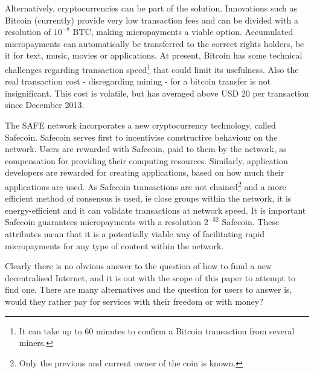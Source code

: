 \documentclass[twocolumn,english]{article}
\begin{document}
Alternatively, cryptocurrencies can be part of the solution. Innovations such as Bitcoin (currently) provide very low transaction fees and can be divided with a resolution of $10^{-8}$ BTC, making micropayments a viable option. Accumulated micropayments can automatically be transferred to the correct rights holders, be it for text, music, movies or applications. At present, Bitcoin has some technical challenges regarding transaction speed\footnote{It can take up to 60 minutes to confirm a Bitcoin transaction from several miners.} that could limit its usefulness. Also the real transaction cost - disregarding mining - for a bitcoin transfer is not insignificant. This cost is volatile, but has averaged above USD 20 per transaction since December 2013\cite{blockchain14}.

The SAFE network incorporates a new cryptocurrency technology, called Safecoin.  Safecoin serves first to incentivise constructive behaviour on the network. Users are rewarded with Safecoin, paid to them by the network, as compensation for providing their computing resources. Similarly, application developers are rewarded for creating applications, based on how much their applications are used. As Safecoin transactions are not chained\footnote{Only the previous and current owner of the coin is known.} and a more efficient method of consensus is used, ie close groups within the network, it is energy-efficient and it can validate transactions at network speed. It is important Safecoin guarantees micropayments with a resolution $2^{-32}$ Safecoin. These attributes mean that it is a potentially viable way of facilitating rapid micropayments for any type of content within the network.

Clearly there is no obvious answer to the question of how to fund a new decentralised Internet, and it is out with the scope of this paper to attempt to find one. There are many alternatives and the question for users to answer is, would they rather pay for services with their freedom or with money?
\end{document}
